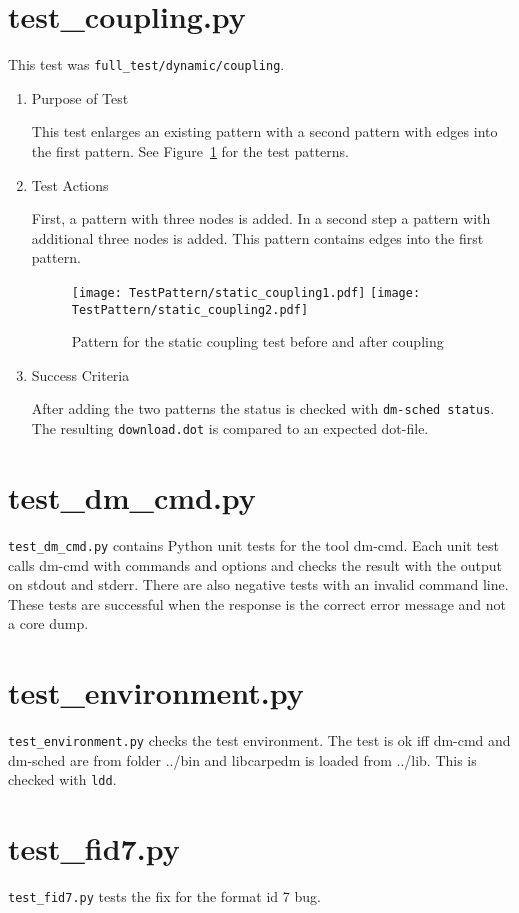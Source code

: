 \documentclass[12pt,a4paper]{report}
\begin{document}
\section{test\_coupling.py}
This test was \texttt{full\_test/dynamic/coupling}.
\begin{enumerate}
	\item Purpose of Test

	This test enlarges an existing pattern with a second pattern with edges into the first
	pattern. See Figure~\ref{fig:Pattern_for_the_static_coupling_test} for the test patterns.
	\item Test Actions

	First, a pattern with three nodes is added. In a second step a pattern with additional three nodes is added.
	This pattern contains edges into the first pattern.
    \begin{figure}
        \centering
        \texttt{[image: TestPattern/static\_coupling1.pdf]}
        \texttt{[image: TestPattern/static\_coupling2.pdf]}
        \caption{Pattern for the static coupling test before and after coupling}
        \label{fig:Pattern_for_the_static_coupling_test}
    \end{figure}
	\item Success Criteria

	After adding the two patterns the status is checked with \texttt{dm-sched status}. The resulting \texttt{download.dot} is
	compared to an expected dot-file.
\end{enumerate}

\section{test\_dm\_cmd.py}
\texttt{test\_dm\_cmd.py} contains Python unit tests for the tool dm-cmd. Each unit test calls dm-cmd
with commands and options and checks the result with the output on stdout and stderr. There are also negative tests with an invalid command
line. These tests are successful when the response is the correct error message and not a core dump.

\section{test\_environment.py}
\texttt{test\_environment.py} checks the test environment. The test is ok iff dm-cmd and dm-sched are
from folder ../bin and libcarpedm is loaded from ../lib. This is checked with \texttt{ldd}.

\section{test\_fid7.py}
\texttt{test\_fid7.py} tests the fix for the format id 7 bug.
\end{document}
